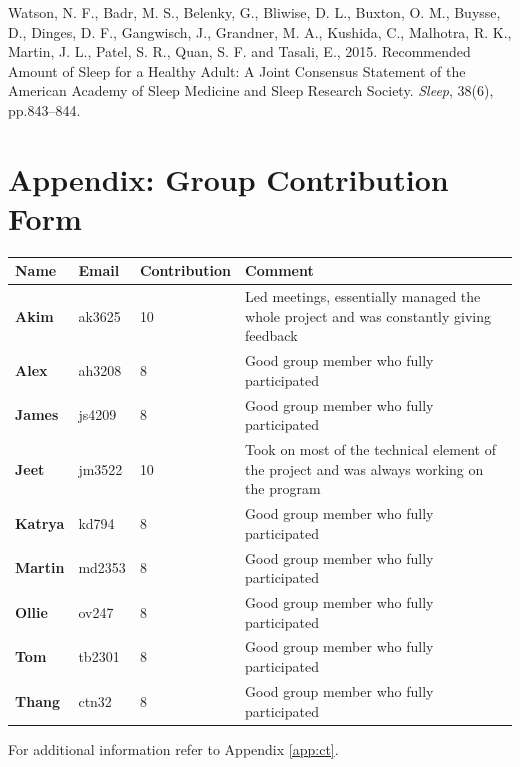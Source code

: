 \documentclass[11pt]{article}
\begin{document}
\begin{thebibliography}{99}
    Watson, N. F., Badr, M. S., Belenky, G., Bliwise, D. L., Buxton, O. M., Buysse, D., 
    Dinges, D. F., Gangwisch, J., Grandner, M. A., Kushida, C., Malhotra, R. K., Martin, J. L., Patel, S. R., 
    Quan, S. F. and Tasali, E., 2015. 
    Recommended Amount of Sleep for a Healthy Adult: 
    A Joint Consensus Statement of the American Academy of Sleep Medicine and Sleep Research Society. 
    \textit{Sleep}, 38(6), pp.843–844.
\end{thebibliography}

\newpage
\section{Appendix: Group Contribution Form}

\begin{table}[!ht]
\centering
\begin{tabular}{|p{1.5cm}|p{1.5cm}|p{3cm}|p{6cm}|}
\hline
\textbf{Name} & \textbf{Email} & \textbf{Contribution} & \textbf{Comment} \\
\hline
\textbf{Akim} &  ak3625 & 10 & Led meetings, essentially managed the whole project and was constantly giving feedback  \\
\hline
\textbf{Alex} & ah3208 & 8 & Good group member who fully participated \\
\hline
\textbf{James} & js4209 & 8 & Good group member who fully participated\\
\hline
\textbf{Jeet} & jm3522 & 10 & Took on most of the technical element of the project and was always working on the program\\
\hline
\textbf{Katrya} & kd794 & 8 & Good group member who fully participated\\
\hline
\textbf{Martin} & md2353 & 8 & Good group member who fully participated \\
\hline
\textbf{Ollie} & ov247 & 8 & Good group member who fully participated\\
\hline
\textbf{Tom} & tb2301 & 8 & Good group member who fully participated\\
\hline
\textbf{Thang} & ctn32 & 8 & Good group member who fully participated\\
\hline
\end{tabular}
\end{table}

For additional information refer to Appendix \ref{app:ct}.

\newpage
\end{document}
